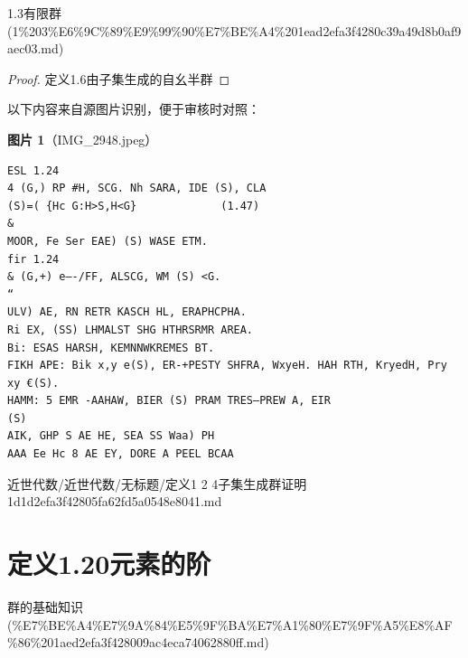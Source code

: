 \begin{note}[来源上级主题]

1.3有限群 (1\%203\%E6\%9C\%89\%E9\%99\%90\%E7\%BE\%A4\%201ead2efa3f4280c39a49d8b0af9aec03.md)

\end{note}

\begin{proof}

定义1.6由子集生成的自幺半群

\end{proof}

\begin{note}
以下内容来自源图片识别，便于审核时对照：

\textbf{图片 1}（IMG\_2948.jpeg）
\begin{Verbatim}[fontsize=\small]
ESL 1.24
4 (G,) RP #H, SCG. Nh SARA, IDE (S), CLA
(S)=( {Hc G:H>S,H<G}             (1.47)
&
MOOR, Fe Ser EAE) (S) WASE ETM.
fir 1.24
& (G,+) e—-/FF, ALSCG, WM (S) <G.                                             “
ULV) AE, RN RETR KASCH HL, ERAPHCPHA.
Ri EX, (SS) LHMALST SHG HTHRSRMR AREA.
Bi: ESAS HARSH, KEMNNWKREMES BT.
FIKH APE: Bik x,y e(S), ER-+PESTY SHFRA, WxyeH. HAH RTH, KryedH, Pry
xy €(S).
HAMM: 5 EMR -AAHAW, BIER (S) PRAM TRES—PREW A, EIR
(S)
AIK, GHP S AE HE, SEA SS Waa) PH
AAA Ee Hc 8 AE EY, DORE A PEEL BCAA
\end{Verbatim}

\end{note}

\begin{note}[来源路径]

近世代数/近世代数/无标题/定义1 2 4子集生成群证明 1d1d2efa3f42805fa62fd5a0548e8041.md

\end{note}

\section*{定义1.20元素的阶}

\begin{note}[来源上级主题]

群的基础知识 (\%E7\%BE\%A4\%E7\%9A\%84\%E5\%9F\%BA\%E7\%A1\%80\%E7\%9F\%A5\%E8\%AF\%86\%201aed2efa3f428009ac4eca74062880ff.md)

\end{note}

